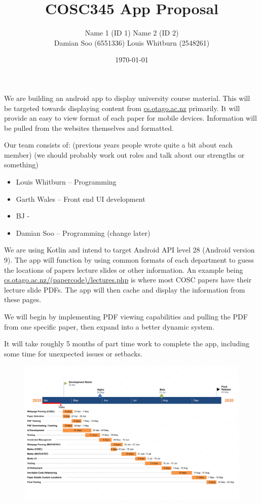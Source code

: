 \documentclass{article}
\title{COSC345 App Proposal}
\author{Name 1 (ID 1) Name 2 (ID 2) \\ Damian Soo (6551336) Louis Whitburn (2548261)}
\date{\today}
\begin{document}
	\maketitle
	
	We are building an android app to display university course material. This will be targeted towards displaying content from \url{cs.otago.ac.nz} primarily. It will provide an easy to view format of each paper for mobile devices. Information will be pulled from the websites themselves and formatted.
	
	Our team consists of: (previous years people wrote quite a bit about each member)
	(we should probably work out roles and talk about our strengths or something)
	\begin{itemize}
		\item Louis Whitburn – Programming
		\item Garth Wales – Front end UI development
		\item BJ - 
		\item Damian Soo – Programming (change later)
	\end{itemize}

	We are using Kotlin and intend to target Android API level 28 (Android version 9). The app will function by using common formats of each department to guess the locations of papers lecture slides or other information. An example being \url{cs.otago.ac.nz/(papercode)/lectures.php} is where most COSC papers have their lecture slide PDFs. The app will then cache and display the information from these pages.

	We will begin by implementing PDF viewing capabilities and pulling the PDF from one specific paper, then expand into a better dynamic system. 

	It will take roughly 5 months of part time work to complete the app, including some time for unexpected issues or setbacks.
	
	\begin{figure}[h!]
		\centering
		\includegraphics[width=\linewidth]{chart.png}
	\end{figure}
	
\end{document}
